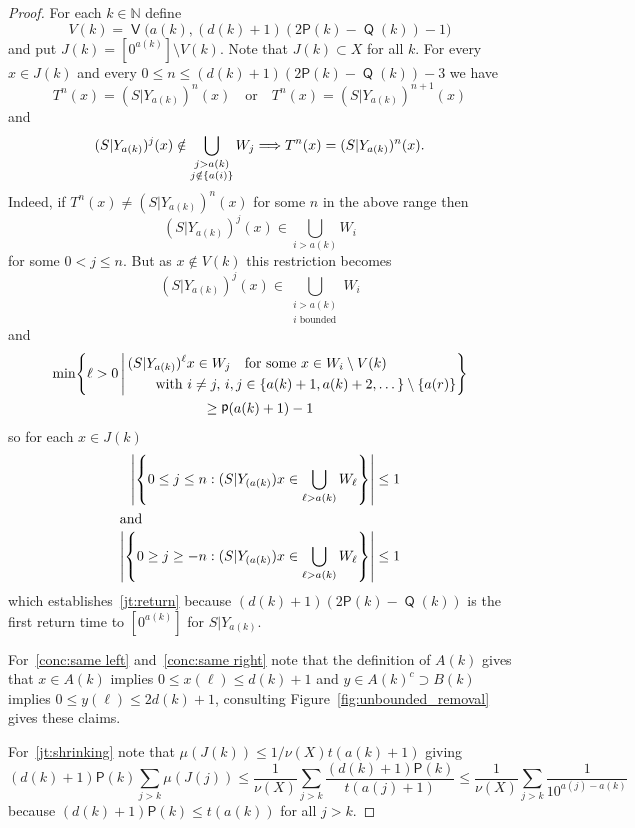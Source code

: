 \documentclass[10pt]{amsart}
\theoremstyle{definition}\newtheorem{defi}[theo]{Definition}\newtheorem{rema}[theo]{Remark}\newtheorem{exam}[theo]{Example}\newtheorem{exem}[theo]{Example}\newtheorem{nota}[theo]{Notation}
\DeclareMathOperator{\bad}{\mathsf{V}}
\DeclareMathOperator{\p}{\mathsf{p}}
\DeclareMathOperator{\Q}{\mathsf{Q}}
\newcommand{\N}{\mathbb{N}}
\renewcommand{\P}{\mathsf{P}}
\let\originalleft\left
\let\originalright\right
\renewcommand{\left}{\mathopen{}\mathclose\bgroup\originalleft}
\renewcommand{\right}{\aftergroup\egroup\originalright}
\renewcommand*{\implies}{\mathchoice{\Longrightarrow}{\Rightarrow}{\Rightarrow}{\Rightarrow}}
\begin{document}
\begin{proof}
For each $k \in \N$ define
\[
V(k) = \bad \bigl(a(k),(d(k)+1)(2\P(k)-\Q(k))-1\bigr)
\]
and put $J(k) = [0^{a(k)}] \setminus V(k)$. Note that $J(k) \subset X$ for all $k$. For every $x \in J(k)$ and every $0 \le n \le (d(k)+1)(2\P(k)-\Q(k))-3$ we have
\begin{equation}\label{eqn:tower_discrep}
T^n(x) = (S|Y_{a(k)})^n(x) \quad\text{or}\quad T^n(x) = (S|Y_{a(k)})^{n+1}(x)
\end{equation}
and
\begin{equation}\label{eq:equal}
(S|Y_{a(k)})^j(x) \notin \bigcup_{\substack{j>a(k)\\j \notin\{a(i)\}}}W_j
\implies T^n(x)=(S|Y_{a(k)})^n(x).
\end{equation}
Indeed, if $T^n(x) \ne (S|Y_{a(k)})^n(x)$ for some $n$ in the above range then
\[
(S|Y_{a(k)})^j(x) \in \bigcup_{i>a(k)}W_i
\]
for some $0 < j \le n$. But as $x \notin V(k)$ this restriction becomes
\[
(S|Y_{a(k)})^j(x) \in \bigcup_{\substack{i>a(k)\\i \text{ bounded}}} W_i
\]
and
\begin{multline*}
\min
\left\{
\ell>0 \,\middle|\,
\begin{aligned}
&(S|Y_{a(k)})^\ell x \in W_j\quad \text{for some } x \in W_i \setminus V(k)\\
&\qquad\text{with }i\neq j, \, i,j\in \{a(k)+1,a(k)+2,\dots\}\setminus \{a(r)\}
\end{aligned}
\right\}\\
\ge \p(a(k)+1)-1
\end{multline*}
so for each $x \in J(k)$
\begin{align*}
\left|
\left\{ 0\leq j\leq n:(S|Y_{(a(k)})x \in \bigcup_{\ell>a(k)}W_\ell \right\} \right|
&\leq 1\\
\intertext{and}
\left| \left\{ 0\geq j\geq -n:(S|Y_{(a(k)})x \in \bigcup_{\ell>a(k)}W_\ell \right\} \right| &\leq 1
\end{align*}
which establishes~\eqref{jt:return} because $(d(k)+1)(2\P(k)-\Q(k))$ is the first return time to $[0^{a(k)}]$ for $S|Y_{a(k)}$.

For~\eqref{conc:same left} and~\eqref{conc:same right} note that the definition of $A(k)$ gives that $x \in A(k)$ implies $0\leq x(\ell)\leq d(k)+1$ and $y \in A(k)^c\supset B(k)$ implies $0\leq y(\ell)\leq 2d(k)+1$, consulting Figure~\ref{fig:unbounded_removal} gives these claims.

For~\eqref{jt:shrinking} note that $\mu(J(k)) \le 1/\nu(X) t(a(k)+1)$ giving
\begin{equation}\label{eq:est JT}
(d(k)+1)\P(k) \sum_{j > k} \mu(J(j))
\le
\frac{1}{\nu(X)} \sum_{j > k} \frac{(d(k)+1)\P(k)}{t(a(j)+1)}
\le
\frac{1}{\nu(X)} \sum_{j > k} \frac{1}{10^{a(j) - a(k)}}
\end{equation}
because $(d(k)+1)\P(k) \le t(a(k))$ for all $j > k$.


\end{proof}
\end{document}
